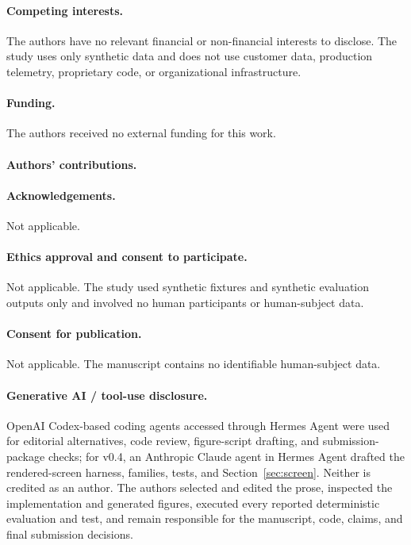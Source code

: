 \documentclass[pdflatex,sn-mathphys-num]{sn-jnl}
\newif\ifblind
\begin{document}
\paragraph{Competing interests.}
The authors have no relevant financial or non-financial interests to disclose.
The study uses only synthetic data and does not use customer data, production
telemetry, proprietary code, or organizational infrastructure.

\paragraph{Funding.}
The authors received no external funding for this work.

\paragraph{Authors' contributions.}
\ifblind
Both authors (names withheld for double-anonymous review) contributed equally:
they designed the runtime mediation architecture and evaluation methodology,
implemented the reference scaffold and deterministic coverage harness, analyzed the results,
and wrote the manuscript.
\else
\namedauthorcontributions
\fi

\paragraph{Acknowledgements.}
Not applicable.

\paragraph{Ethics approval and consent to participate.}
Not applicable. The study used synthetic fixtures and synthetic evaluation
outputs only and involved no human participants or human-subject data.

\paragraph{Consent for publication.}
Not applicable. The manuscript contains no identifiable human-subject data.

\paragraph{Generative AI / tool-use disclosure.}
OpenAI Codex-based coding agents accessed through Hermes Agent were used for
editorial alternatives, code review, figure-script drafting, and
submission-package checks; for v0.4, an Anthropic Claude agent in Hermes
Agent drafted the rendered-screen harness, families, tests, and
Section~\ref{sec:screen}. Neither is credited as an author. The authors
selected and edited the prose, inspected the implementation and generated
figures, executed every reported deterministic evaluation and test, and remain
responsible for the manuscript, code, claims, and final submission decisions.
\end{document}
